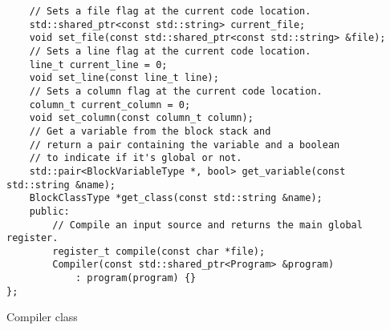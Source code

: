 \begin{code}
\begin{verbatim}
    // Sets a file flag at the current code location.
    std::shared_ptr<const std::string> current_file;
    void set_file(const std::shared_ptr<const std::string> &file);
    // Sets a line flag at the current code location.
    line_t current_line = 0;
    void set_line(const line_t line);
    // Sets a column flag at the current code location.
    column_t current_column = 0;
    void set_column(const column_t column);
    // Get a variable from the block stack and
    // return a pair containing the variable and a boolean
    // to indicate if it's global or not.
    std::pair<BlockVariableType *, bool> get_variable(const std::string &name);
    BlockClassType *get_class(const std::string &name);
    public:
        // Compile an input source and returns the main global register.
        register_t compile(const char *file);
        Compiler(const std::shared_ptr<Program> &program)
            : program(program) {}
};
\end{verbatim}
\caption{Compiler class}
\label{ls:compiler_class}
\end{code}
